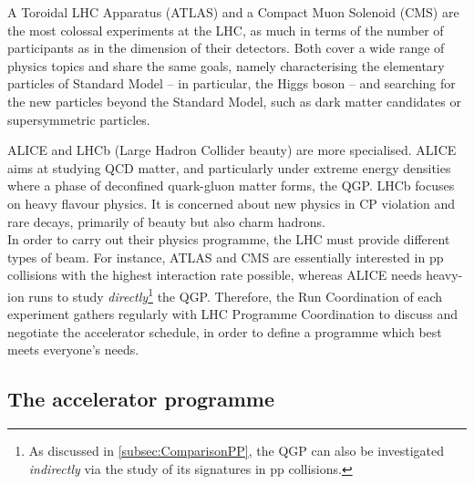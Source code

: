 A Toroidal LHC Apparatus (ATLAS) and a Compact Muon Solenoid (CMS) are the most colossal experiments at the LHC, as much in terms of the number of participants as in the dimension of their detectors. Both cover a wide range of physics topics and share the same goals, namely characterising the elementary particles of Standard Model -- in particular, the Higgs boson -- and searching for the new particles beyond the Standard Model, such as dark matter candidates or supersymmetric particles. 

ALICE and LHCb (Large Hadron Collider beauty) are more specialised. ALICE aims at studying QCD matter, and particularly under extreme energy densities where a phase of deconfined quark-gluon matter forms, the QGP. LHCb focuses on heavy flavour physics. It is concerned about new physics in CP violation and rare decays, primarily of beauty but also charm hadrons.\\

In order to carry out their physics programme, the LHC must provide different types of beam. For instance, ATLAS and CMS are essentially interested in pp collisions with the highest interaction rate possible, whereas ALICE needs heavy-ion runs to study \textit{directly}\footnote{As discussed in \Sec\ref{subsec:ComparisonPP}, the QGP can also be investigated \textit{indirectly} via the study of its signatures in pp collisions.} the QGP. Therefore, the Run Coordination of each experiment gathers regularly with LHC Programme Coordination to discuss and negotiate the accelerator schedule, in order to define a programme which best meets everyone's needs.

\subsection{The accelerator programme}
\label{subsec:acceleratorprogramme}

